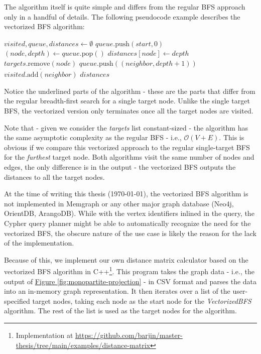 The algorithm itself is quite simple and differs from the regular BFS approach only in a handful of details.
The following pseudocode example describes the vectorized BFS algorithm:

\begin{algorithmic}[1]
        \State $visited, queue, distances \gets \emptyset$
        \State $queue.\text{push}(start, 0)$
            \State $(node, depth) \gets queue.\text{pop}()$
                \State $distances[node] \gets depth$
                \State $\underline{targets.\text{remove}(node)}$
            \EndIf
                    \State $queue.\text{push}((neighbor, depth + 1))$
                    \State $visited.\text{add}(neighbor)$
                \EndIf
            \EndFor
        \EndWhile
        \State \Return $distances$
    \EndFunction
\end{algorithmic}

Notice the underlined parts of the algorithm - these are the parts that differ from the regular breadth-first search for a single target node.
Unlike the single target BFS, the vectorized version only terminates once all the target nodes are visited.

Note that - given we consider the \textit{targets} list constant-sized - the algorithm has the same asymptotic complexity as the regular BFS - i.e., $\mathcal{O}(V + E)$.
This is obvious if we compare this vectorized approach to the regular single-target BFS for the \textit{furthest} target node.
Both algorithms visit the same number of nodes and edges, the only difference is in the output - the vectorized BFS outputs the distances to all the target nodes.

At the time of writing this thesis (\today), the vectorized BFS algorithm is not implemented
in Memgraph or any other major graph database (Neo4j, OrientDB, ArangoDB). 
While with the vertex identifiers inlined in the query, the Cypher query planner might be able to automatically recognize the need for the vectorized BFS, the obscure nature of the use case is likely the reason for the lack of the implementation.

Because of this, we implement our own distance matrix calculator based on the vectorized BFS algorithm in C++\footnote{Implementation at \url{https://github.com/barjin/master-thesis/tree/main/examples/distance-matrix}}.
This program takes the graph data - i.e., the output of \hyperref[fig:monopartite-projection]{Figure \ref*{fig:monopartite-projection}} - in CSV format and parses the data into an in-memory graph representation.
It then iterates over a list of the user-specified target nodes, taking each node as the start node for the \textit{VectorizedBFS} algorithm.
The rest of the list is used as the target nodes for the algorithm. 

